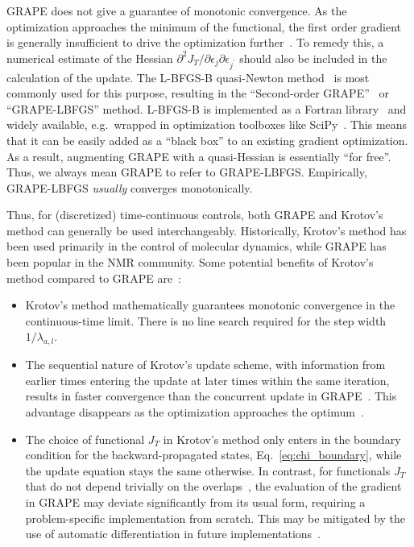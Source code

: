 \documentclass[submission, Phys]{SciPost}
\begin{document}
GRAPE does not give a guarantee of monotonic convergence.
As the optimization approaches the minimum of the functional, the first order
gradient is generally insufficient to drive the optimization
further~\cite{EitanPRA11}.
To remedy this, a numerical estimate of the Hessian \(\partial^2 J_T/\partial
\epsilon_j \partial \epsilon_{j^\prime}\) should also be included in the
calculation of the update.
The L-BFGS-B quasi-Newton method~\cite{ByrdSJSC1995,ZhuATMS97} is most commonly
used for this purpose, resulting in the ``Second-order
GRAPE''~\cite{FouquieresJMR2011} or ``GRAPE-LBFGS'' method.
L-BFGS-B is implemented as a Fortran library~\cite{ZhuATMS97} and widely
available, e.g.\ wrapped in optimization toolboxes like SciPy~\cite{Scipy}.
This means that it can be easily added as a ``black box'' to an existing
gradient optimization.
As a result, augmenting GRAPE with a quasi-Hessian is essentially ``for free''.
Thus, we always mean GRAPE to refer to GRAPE-LBFGS\@.
Empirically, GRAPE-LBFGS \emph{usually} converges monotonically.

Thus, for (discretized) time-continuous controls, both GRAPE and
Krotov's method can generally be used interchangeably. Historically, Krotov's
method has been used primarily in the control of molecular dynamics, while
GRAPE has been popular in the NMR community.
Some potential benefits of Krotov's method compared to GRAPE are~\cite{EitanPRA11}:
\begin{itemize}
  \item Krotov's method mathematically guarantees monotonic convergence in the
    continuous-time limit. There is no line search required for the step width
    $1 / \lambda_{a, l}$.
  \item The sequential nature of Krotov's update scheme, with information from
    earlier times entering the update at later times within the same iteration,
    results in faster convergence than the concurrent update in
    GRAPE~\cite{MachnesPRA11,JaegerPRA14}.  This advantage disappears as the
    optimization approaches the optimum~\cite{EitanPRA11}.
  \item The choice of functional $J_T$ in Krotov's method only enters in the
    boundary condition for the backward-propagated states,
    Eq.~\eqref{eq:chi_boundary}, while the update equation stays the same
    otherwise.
    In contrast, for functionals $J_T$ that do not depend trivially on the
    overlaps~\cite{NevesJMR2009,NguyenJMR2017,AnselPRA2017,SpindlerJMR2012,TosnerACIE2018},
    the evaluation of the gradient in GRAPE may deviate significantly from its
    usual form, requiring a problem-specific implementation from scratch.  This
    may be mitigated by the use of automatic differentiation in future
    implementations~\cite{LeungPRA2017,AbdelhafezPRA2019}.
\end{itemize}
\end{document}
